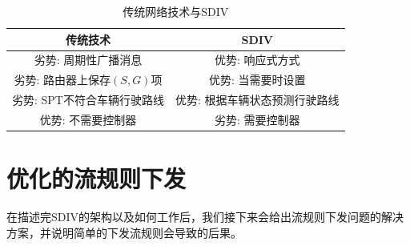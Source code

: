 
\begin{table}[t]
 \caption{\label{table1}传统网络技术与SDIV}
 \centering
 \begin{tabular}{c|c}
  \hline
  传统技术 & SDIV \\
  \hline
  \hline
  劣势: 周期性广播消息 & 优势: 响应式方式 \\
 \hline
 劣势: 路由器上保存$(S,G)$项& 优势: 当需要时设置 \\
 \hline
 劣势: SPT不符合车辆行驶路线 & 优势: 根据车辆状态预测行驶路线\\
  \hline
  优势: 不需要控制器 & 劣势: 需要控制器 \\
  \hline
 \end{tabular}
\end{table}

\section{优化的流规则下发}

在描述完SDIV的架构以及如何工作后，我们接下来会给出流规则下发问题的解决方案，并说明简单的下发流规则会导致的后果。


